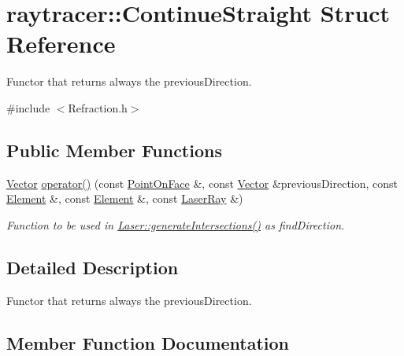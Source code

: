 \hypertarget{structraytracer_1_1ContinueStraight}{}\section{raytracer\+:\+:Continue\+Straight Struct Reference}
\label{structraytracer_1_1ContinueStraight}


Functor that returns always the previous\+Direction.  




{\ttfamily \#include $<$Refraction.\+h$>$}

\subsection*{Public Member Functions}
\begin{DoxyCompactItemize}
\item 
\hyperlink{classraytracer_1_1Vector}{Vector} \hyperlink{structraytracer_1_1ContinueStraight_ad985691646c9dea102f182862750b071}{operator()} (const \hyperlink{structraytracer_1_1PointOnFace}{Point\+On\+Face} \&, const \hyperlink{classraytracer_1_1Vector}{Vector} \&previous\+Direction, const \hyperlink{classraytracer_1_1Element}{Element} \&, const \hyperlink{classraytracer_1_1Element}{Element} \&, const \hyperlink{classraytracer_1_1LaserRay}{Laser\+Ray} \&)
\begin{DoxyCompactList}\small\item\em Function to be used in \hyperlink{classraytracer_1_1Laser_a40fd2b112fb1de646861d7e93ac303e3}{Laser\+::generate\+Intersections()} as find\+Direction. \end{DoxyCompactList}\end{DoxyCompactItemize}


\subsection{Detailed Description}
Functor that returns always the previous\+Direction. 

\subsection{Member Function Documentation}
\mbox{\label{structraytracer_1_1ContinueStraight_ad985691646c9dea102f182862750b071}} 
